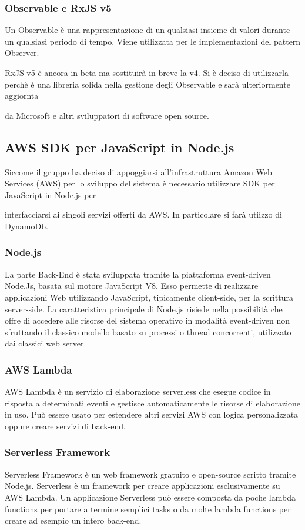 \subsubsection{Observable e RxJS v5}

Un Observable è una rappresentazione di un qualsiasi insieme di valori durante un qualsiasi periodo di tempo. Viene utilizzata per le implementazioni del pattern Observer.

RxJS v5 è ancora in beta ma sostituirà in breve la v4. Si è deciso di utilizzarla perchè è una libreria solida nella gestione degli Observable e sarà ulteriormente aggiornta

da Microsoft e altri sviluppatori di software open source.


\subsection{AWS SDK per JavaScript in Node.js}

Siccome il gruppo ha deciso di appoggiarsi all'infrastruttura Amazon Web Services (AWS) per lo sviluppo del sistema è necessario utilizzare SDK per JavaScript in Node.js per

interfacciarsi ai singoli servizi offerti da AWS. In particolare si farà utiizzo di DynamoDb.


\subsubsection{Node.js}
La parte Back-End è stata sviluppata tramite la piattaforma event-driven Node.Js, basata sul motore JavaScript V8. Esso permette di realizzare applicazioni Web utilizzando JavaScript, tipicamente client-side, per la scrittura server-side. La caratteristica principale di Node.js risiede nella possibilità che offre di accedere alle risorse del sistema operativo in modalità event-driven non sfruttando il classico modello basato su processi o thread concorrenti, utilizzato dai classici web server.

\subsubsection{AWS Lambda}
AWS Lambda è un servizio di elaborazione serverless che esegue codice in risposta a determinati eventi e gestisce automaticamente le risorse di elaborazione in uso. Può essere usato per estendere altri servizi AWS con logica personalizzata oppure creare servizi di back-end.  

\subsubsection{Serverless Framework}
Serverless Framework è un web framework gratuito e open-source scritto tramite Node.js. Serverless è un framework per creare applicazioni esclusivamente su AWS Lambda. Un applicazione Serverless può essere composta da poche lambda functions per portare a termine semplici tasks o da molte lambda functions per creare ad esempio un intero back-end.

